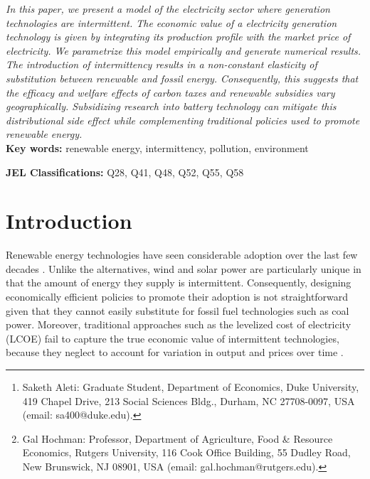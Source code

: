 \documentclass[11pt,a4paper,leqno]{extarticle}
\begin{document}
	
	\title{}
	
	\author[]{Saketh Aleti\thanks{Saketh Aleti: Graduate Student, Department of Economics, Duke University, 419 Chapel Drive, 213 Social Sciences Bldg., Durham, NC 27708-0097, USA (email: sa400@duke.edu).}  \, and  Gal Hochman\thanks{ Gal Hochman: Professor, Department of Agriculture, Food \& Resource Economics, Rutgers University, 116 Cook Office Building, 55 Dudley Road, New Brunswick, NJ 08901, USA (email: gal.hochman@rutgers.edu).}}
	
	
	\maketitle
	
	\begin{addmargin}[0.5in]{0.5in}
		\textit{In this paper, we present a model of the electricity sector where generation technologies are intermittent. The economic value of a electricity generation technology is given by integrating its production profile with the market price of electricity. We parametrize this model empirically and generate numerical results. The introduction of intermittency results in a non-constant elasticity of substitution between renewable and fossil energy. Consequently, this suggests that the efficacy and welfare effects of carbon taxes and renewable subsidies vary geographically. Subsidizing research into battery technology can mitigate this distributional side effect while complementing traditional policies used to promote renewable energy. 
		}
		\\
		\noindent\textbf{Key words:} renewable energy, intermittency, pollution, environment
		
		\noindent\textbf{JEL Classifications:} Q28, Q41, Q48, Q52, Q55, Q58
	\end{addmargin}
	
	
	
	\section{Introduction}
	
	Renewable energy technologies have seen considerable adoption over the last few decades \citep{EIArenew}. Unlike the alternatives, wind and solar power are particularly unique in that the amount of energy they supply is intermittent. Consequently, designing economically efficient policies to promote their adoption is not straightforward given that they cannot easily substitute for fossil fuel technologies such as coal power. Moreover, traditional approaches such as the levelized cost of electricity (LCOE) fail to capture the true economic value of intermittent technologies, because they neglect to account for variation in output and prices over time \citep{Joskow2011}.  
	
\end{document}
